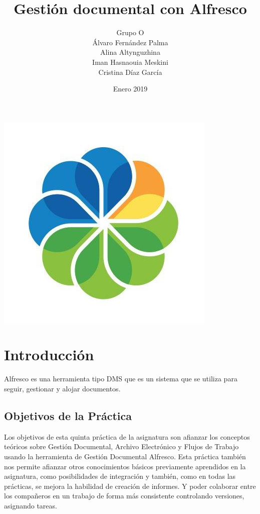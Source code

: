 \documentclass{article}
\title{Gestión documental con Alfresco}
\author{Grupo O\\Álvaro Fernández Palma\\ Alina Altynguzhina\\ Iman Hasnaouia Meskini\\ Cristina Díaz García}
\date{Enero 2019}
\begin{document}

\begin{titlingpage}
\maketitle

\begin{center}
\includegraphics[scale=0.4]{images/alfresco.jpg} 
\end{center}

\end{titlingpage}

\newpage

\tableofcontents

\newpage

\section{Introducción}

Alfresco es una herramienta tipo DMS que es un sistema que se utiliza para seguir, gestionar y alojar documentos. 

\subsection{Objetivos de la Práctica}

Los objetivos de esta quinta práctica de la asignatura son afianzar los conceptos teóricos sobre Gestión Documental, Archivo Electrónico y Flujos de Trabajo usando la herramienta de Gestión Documental Alfresco. Esta práctica también nos permite afianzar otros conocimientos básicos previamente aprendidos en la asignatura, como posibilidades de integración y también, como en todas las prácticas, se mejora la habilidad de creación de informes. Y poder colaborar entre los compañeros en un trabajo de forma más consistente controlando versiones, asignando tareas.
\end{document}
